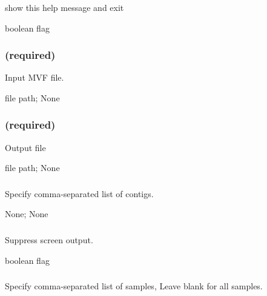 \documentclass[letterpaper,11pt,english]{sphinxmanual}
\begin{document}
\subsubsection{}
\label{\detokenize{prog_desc:id76}}
 show this help message and exit

 boolean flag


\subsubsection{ (required)}
\label{\detokenize{prog_desc:id77}}
 Input MVF file.

 file path;  None


\subsubsection{ (required)}
\label{\detokenize{prog_desc:id78}}
 Output file

 file path;  None


\subsubsection{}
\label{\detokenize{prog_desc:id79}}
 Specify comma-separated list of contigs.

 None;  None


\subsubsection{}
\label{\detokenize{prog_desc:id80}}
 Suppress screen output.

 boolean flag


\subsubsection{}
\label{\detokenize{prog_desc:id81}}
 Specify comma-separated list of samples, Leave blank for all samples.
\end{document}
